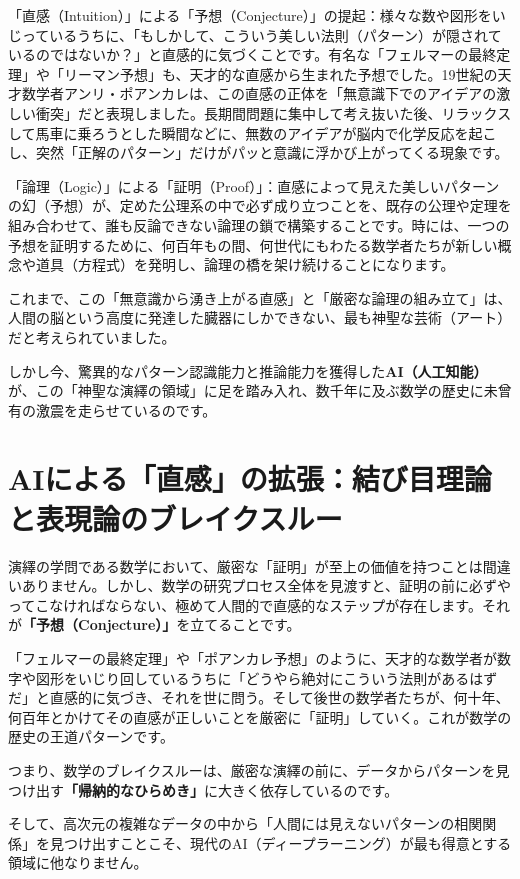 「直感（Intuition）」による「予想（Conjecture）」の提起：様々な数や図形をいじっているうちに、「もしかして、こういう美しい法則（パターン）が隠されているのではないか？」と直感的に気づくことです。有名な「フェルマーの最終定理」や「リーマン予想」も、天才的な直感から生まれた予想でした。19世紀の天才数学者アンリ・ポアンカレは、この直感の正体を「無意識下でのアイデアの激しい衝突」だと表現しました。長期間問題に集中して考え抜いた後、リラックスして馬車に乗ろうとした瞬間などに、無数のアイデアが脳内で化学反応を起こし、突然「正解のパターン」だけがパッと意識に浮かび上がってくる現象です。

「論理（Logic）」による「証明（Proof）」：直感によって見えた美しいパターンの幻（予想）が、定めた公理系の中で必ず成り立つことを、既存の公理や定理を組み合わせて、誰も反論できない論理の鎖で構築することです。時には、一つの予想を証明するために、何百年もの間、何世代にもわたる数学者たちが新しい概念や道具（方程式）を発明し、論理の橋を架け続けることになります。

これまで、この「無意識から湧き上がる直感」と「厳密な論理の組み立て」は、人間の脳という高度に発達した臓器にしかできない、最も神聖な芸術（アート）だと考えられていました。

しかし今、驚異的なパターン認識能力と推論能力を獲得した\textbf{AI（人工知能）}が、この「神聖な演繹の領域」に足を踏み入れ、数千年に及ぶ数学の歴史に未曾有の激震を走らせているのです。

\section{AIによる「直感」の拡張：結び目理論と表現論のブレイクスルー}

演繹の学問である数学において、厳密な「証明」が至上の価値を持つことは間違いありません。しかし、数学の研究プロセス全体を見渡すと、証明の前に必ずやってこなければならない、極めて人間的で直感的なステップが存在します。それが\textbf{「予想（Conjecture）」}を立てることです。

「フェルマーの最終定理」や「ポアンカレ予想」のように、天才的な数学者が数字や図形をいじり回しているうちに「どうやら絶対にこういう法則があるはずだ」と直感的に気づき、それを世に問う。そして後世の数学者たちが、何十年、何百年とかけてその直感が正しいことを厳密に「証明」していく。これが数学の歴史の王道パターンです。

つまり、数学のブレイクスルーは、厳密な演繹の前に、データからパターンを見つけ出す\textbf{「帰納的なひらめき」}に大きく依存しているのです。

そして、高次元の複雑なデータの中から「人間には見えないパターンの相関関係」を見つけ出すことこそ、現代のAI（ディープラーニング）が最も得意とする領域に他なりません。

